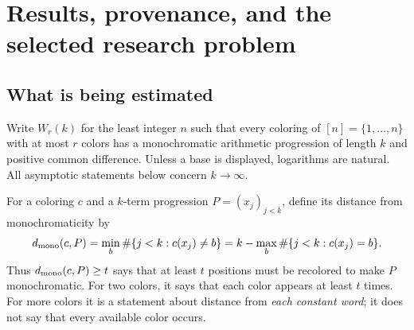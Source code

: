 \begin{abstract}
We refine the cyclic construction in OpenAI Math family 160,
\emph{Quantitative Superexponential Bounds for van der Waerden Numbers}.
For absolute constants \(C,K>0\) and every integer \(k\ge K\), we prove
\[
 \log W_2(k)>
 \frac{k}{24}\bigl(\log k-5\log\log k\bigr)-Ck .
\]
The construction supplies more than nonmonochromaticity: every \(k\)-term
progression differs from every constant coloring in at least
\(\fl{b k^{2/3}(\log k)^{5/3}}\) positions, for an absolute \(b>0\).
A direct three-color version has leading coefficient \(1/18\).
Combining the two cyclic constructions gives a uniform all-color
bound with an exactly optimized binary--ternary coefficient.
The improvements come from a two-point norm-band bound, balancing
the light positions left outside heavy blocks, an elementary estimate
for the small-prime dilation, and a joint optimization of two distinct
signature costs.
We give the entire ordinary mathematical argument, including the
geometric and probabilistic ingredients inherited from the source.
This is a quantitative strengthening of that repository result, not a
new claim to have first resolved the underlying superexponential-growth
problem. No Lean formalization of the strengthened statements is claimed.
\end{abstract}

\section{Results, provenance, and the selected research problem}
\label{sec:results}

\subsection{What is being estimated}

Write \(W_r(k)\) for the least integer \(n\) such that every coloring of
\([n]=\{1,\ldots,n\}\) with at most \(r\) colors has a monochromatic
arithmetic progression of length \(k\) and positive common difference.
Unless a base is displayed, logarithms are natural. All asymptotic
statements below concern \(k\to\infty\).

For a coloring \(c\) and a \(k\)-term progression \(P=(x_j)_{j<k}\),
define its distance from monochromaticity by
\begin{equation}\label{eq:distance}
 d_{\rm mono}(c,P)
 =\min_b \#\{j<k:c(x_j)\ne b\}
 =k-\max_b\#\{j<k:c(x_j)=b\}.
\end{equation}
Thus \(d_{\rm mono}(c,P)\ge t\) says that at least \(t\) positions
must be recolored to make \(P\) monochromatic. For two colors, it says
that each color appears at least \(t\) times. For more colors it is a
statement about distance from \emph{each constant word}; it does not
say that every available color occurs.

